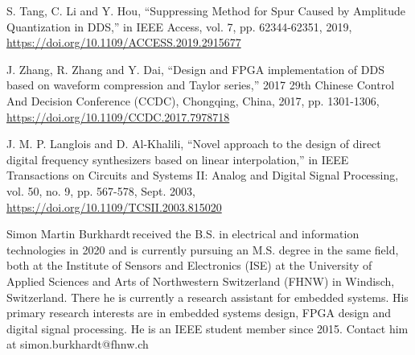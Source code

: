 \documentclass[lettersize,journal]{IEEEtran}
\begin{document}
\begin{thebibliography}{00}
	 S. Tang, C. Li and Y. Hou, ``Suppressing Method for Spur Caused by Amplitude Quantization in DDS,'' in IEEE Access, vol. 7, pp. 62344-62351, 2019, \url{https://doi.org/10.1109/ACCESS.2019.2915677}
	
	 J. Zhang, R. Zhang and Y. Dai, ``Design and FPGA implementation of DDS based on waveform compression and Taylor series,'' 2017 29th Chinese Control And Decision Conference (CCDC), Chongqing, China, 2017, pp. 1301-1306, \url{https://doi.org/10.1109/CCDC.2017.7978718}
	
	 J. M. P. Langlois and D. Al-Khalili, ``Novel approach to the design of direct digital frequency synthesizers based on linear interpolation,'' in IEEE Transactions on Circuits and Systems II: Analog and Digital Signal Processing, vol. 50, no. 9, pp. 567-578, Sept. 2003, \url{https://doi.org/10.1109/TCSII.2003.815020}


\end{thebibliography}

\begin{IEEEbiography}{Simon Martin Burkhardt}{\,}received the B.S. in electrical and information technologies in 2020 and is currently pursuing an M.S. degree in the same field, both at the Institute of Sensors and Electronics (ISE) at the University of Applied Sciences and Arts of Northwestern Switzerland (FHNW) in Windisch, Switzerland. There he is currently a research assistant for embedded systems.
His primary research interests are in embedded systems design, FPGA design and digital signal processing.
He is an IEEE student member since 2015.
Contact him at simon.burkhardt@fhnw.ch
\end{IEEEbiography}


\vfill
\end{document}
